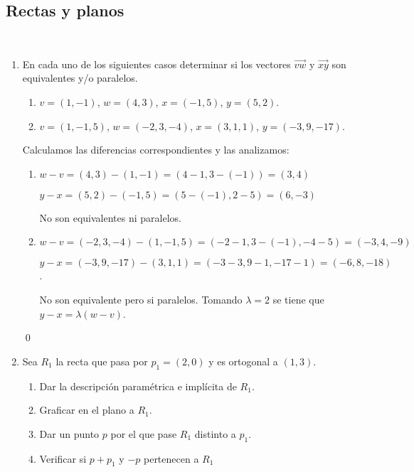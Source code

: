 \subsection*{Rectas y planos}

\

\begin{enumerate}[resume,topsep=6pt, itemsep=.4cm]
 
\item En  cada uno de los siguientes casos determinar si los
vectores  $\overrightarrow{vw}$ y $\overrightarrow{xy}$ son
equivalentes y/o paralelos.
\begin{enumerate}
\item   $v=(1,-1)$,  $w=(4,3)$, $x=(-1,5)$, $y=(5,2)$. 
\item   $v=(1,-1,5)$,  $w=(-2,3,-4)$,  $x=(3,1,1)$,  $y=(-3,9,-17)$.
\end{enumerate}


\rta Calculamos las diferencias correspondientes y las analizamos:
\begin{enumerate}
\item $w - v = (4,3) - (1,-1) = (4-1,3-(-1)) = (3,4)$

$ y-x = (5,2) - (-1,5) = (5-(-1),2-5) = (6,-3)$

No son equivalentes ni paralelos.

\item $w-v = (-2,3,-4) - (1,-1,5) = (-2-1,3-(-1),-4-5) = (-3,4,-9)$

$ y-x = (-3,9,-17) - (3,1,1) = (-3-3,9-1,-17-1) = (-6,8,-18)$.

No son equivalente pero si paralelos. Tomando $\lambda=2$ se tiene que $y-x = \lambda (w-v)$.

\end{enumerate}

\qed

\item Sea $R_1$ la recta que pasa por $p_1=(2,0)$ y es ortogonal a $(1,3)$.
\begin{enumerate}
 \item Dar la descripción paramétrica e implícita de $R_1$.
 \item Graficar en el plano a $R_1$.
 \item Dar un punto $p$ por el que pase $R_1$ distinto a $p_1$.
 \item Verificar si $p+p_1$ y $-p$ pertenecen a $R_1$
\end{enumerate}


\end{enumerate}
